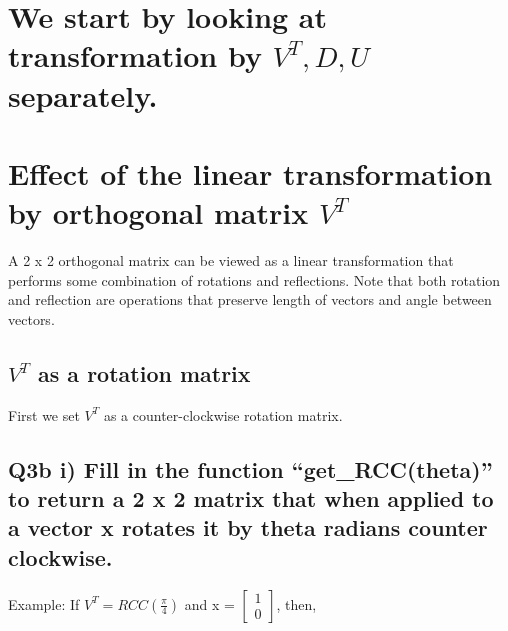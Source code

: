 \documentclass[11pt]{article}
\begin{document}
\begin{Verbatim}[commandchars=\\\{\}]
\end{Verbatim}


    \hypertarget{we-start-by-looking-at-transformation-by-vt-d-u-separately.}{%
\section{\texorpdfstring{We start by looking at transformation by
\(V^T, D, U\)
separately.}{We start by looking at transformation by V\^{}T, D, U separately.}}\label{we-start-by-looking-at-transformation-by-vt-d-u-separately.}}

    \hypertarget{effect-of-the-linear-transformation-by-orthogonal-matrix-vt}{%
\section{\texorpdfstring{Effect of the linear transformation by
orthogonal matrix
\(V^T\)}{Effect of the linear transformation by orthogonal matrix V\^{}T}}\label{effect-of-the-linear-transformation-by-orthogonal-matrix-vt}}

A 2 x 2 orthogonal matrix can be viewed as a linear transformation that
performs some combination of rotations and reflections. Note that both
rotation and reflection are operations that preserve length of vectors
and angle between vectors.

    \hypertarget{vt-as-a-rotation-matrix}{%
\subsection{\texorpdfstring{\(V^T\) as a rotation
matrix}{V\^{}T as a rotation matrix}}\label{vt-as-a-rotation-matrix}}

First we set \(V^T\) as a counter-clockwise rotation matrix.

\hypertarget{q3b-i-fill-in-the-function-get_rcctheta-to-return-a-2-x-2-matrix-that-when-applied-to-a-vector-x-rotates-it-by-theta-radians-counter-clockwise.}{%
\subsection{Q3b i) Fill in the function ``get\_RCC(theta)'' to return a
2 x 2 matrix that when applied to a vector x rotates it by theta radians
counter
clockwise.}\label{q3b-i-fill-in-the-function-get_rcctheta-to-return-a-2-x-2-matrix-that-when-applied-to-a-vector-x-rotates-it-by-theta-radians-counter-clockwise.}}

Example: If \(V^T = RCC\left(\frac{\pi}{4}\right)\) and x =
\(\begin{bmatrix}1 \\ 0\end{bmatrix}\), then,
\end{document}
